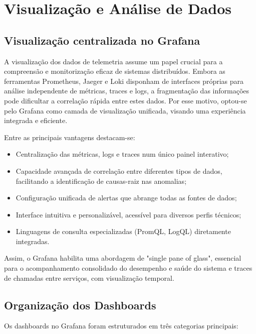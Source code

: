 \chapter{Visualização e Análise de Dados}

\section{Visualização centralizada no Grafana}

A visualização dos dados de telemetria assume um papel crucial para a compreensão e monitorização eficaz de sistemas distribuídos. Embora as ferramentas Prometheus, Jaeger e Loki disponham de interfaces próprias para análise independente de métricas, traces e logs, a fragmentação das informações pode dificultar a correlação rápida entre estes dados. Por esse motivo, optou-se pelo Grafana como camada de visualização unificada, visando uma experiência integrada e eficiente.

Entre as principais vantagens destacam-se:

\begin{itemize}
    \item Centralização das métricas, logs e traces num único painel interativo;
    \item Capacidade avançada de correlação entre diferentes tipos de dados, facilitando a identificação de causas-raiz nas anomalias;
    \item Configuração unificada de alertas que abrange todas as fontes de dados;
    \item Interface intuitiva e personalizável, acessível para diversos perfis técnicos;
    \item Linguagens de consulta especializadas (PromQL, LogQL) diretamente integradas.
\end{itemize}

Assim, o Grafana habilita uma abordagem de "single pane of glass", essencial para o acompanhamento consolidado do desempenho e saúde do sistema e traces de chamadas entre serviços, com visualização temporal.

\break

\section{Organização dos Dashboards}

Os dashboards no Grafana foram estruturados em três categorias principais:

